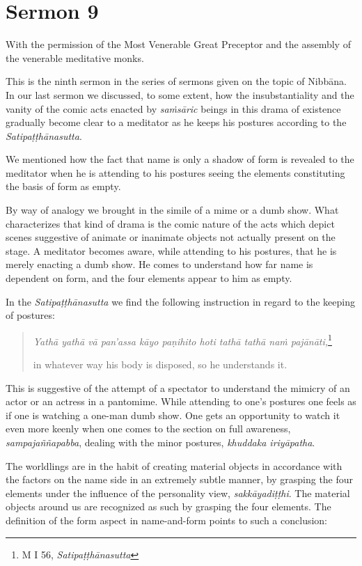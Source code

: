 \chapter{Sermon 9}

\NibbanaOpeningQuote

With the permission of the Most Venerable Great Preceptor and the assembly of the venerable meditative monks.

This is the ninth sermon in the series of sermons given on the topic of Nibbāna. In our last sermon we discussed, to some extent, how the insubstantiality and the vanity of the comic acts enacted by \emph{saṁsāric} beings in this drama of existence gradually become clear to a meditator as he keeps his postures according to the \emph{Satipaṭṭhānasutta}.

We mentioned how the fact that name is only a shadow of form is revealed to the meditator when he is attending to his postures seeing the elements constituting the basis of form as empty.

By way of analogy we brought in the simile of a mime or a dumb show. What characterizes that kind of drama is the comic nature of the acts which depict scenes suggestive of animate or inanimate objects not actually present on the stage. A meditator becomes aware, while attending to his postures, that he is merely enacting a dumb show. He comes to understand how far name is dependent on form, and the four elements appear to him as empty.

In the \emph{Satipaṭṭhānasutta} we find the following instruction in regard to the keeping of postures:

\begin{quote}
\emph{Yathā yathā vā pan'assa kāyo paṇihito hoti tathā tathā naṁ pajānāti,}\footnote{M I 56, \emph{Satipaṭṭhānasutta}}

in whatever way his body is disposed, so he understands it.
\end{quote}

This is suggestive of the attempt of a spectator to understand the mimicry of an actor or an actress in a pantomime. While attending to one's postures one feels as if one is watching a one-man dumb show. One gets an opportunity to watch it even more keenly when one comes to the section on full awareness, \emph{sampajaññapabba}, dealing with the minor postures, \emph{khuddaka iriyāpatha}.

The worldlings are in the habit of creating material objects in accordance with the factors on the name side in an extremely subtle manner, by grasping the four elements under the influence of the personality view, \emph{sakkāyadiṭṭhi}. The material objects around us are recognized as such by grasping the four elements. The definition of the form aspect in name-and-form points to such a conclusion:

